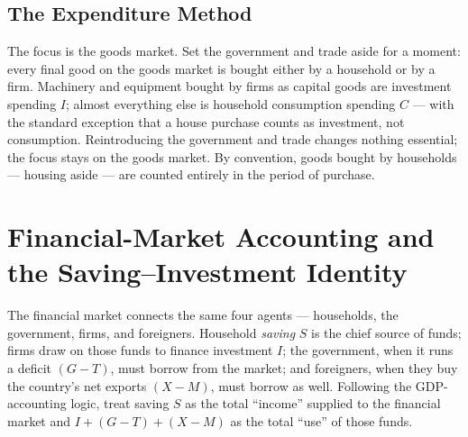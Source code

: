 \subsection{The Expenditure Method}


The focus is the goods market. Set the government and trade aside for a moment: every final good on the goods market is bought either by a household or by a firm. Machinery and equipment bought by firms as capital goods are investment spending $I$; almost everything else is household consumption spending $C$ --- with the standard exception that a house purchase counts as investment, not consumption. Reintroducing the government and trade changes nothing essential; the focus stays on the goods market. By convention, goods bought by households --- housing aside --- are counted entirely in the period of purchase.


\section{Financial-Market Accounting and the Saving--Investment Identity}

The financial market connects the same four agents --- households, the government, firms, and foreigners. Household \emph{saving} $S$ is the chief source of funds; firms draw on those funds to finance investment $I$; the government, when it runs a deficit $(G-T)$, must borrow from the market; and foreigners, when they buy the country's net exports $(X-M)$, must borrow as well. Following the GDP-accounting logic, treat saving $S$ as the total ``income'' supplied to the financial market and $I + (G-T) + (X-M)$ as the total ``use'' of those funds.

